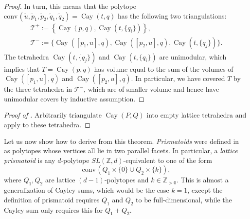 \documentclass{amsart}
\theoremstyle{plain}
\theoremstyle{definition}
\newcommand{\Z}{ \ensuremath{\mathbb{Z}}}
\newcommand{\conv}{\ensuremath{\mathrm{conv}}\hspace{1pt}}
\newcommand{\cayley}{\operatorname{Cay}}
\newcommand{\giulia}[1]{\todo[size=\tiny,color=blue!30]{#1 \\ \hfill --- G.}}
\begin{document}
\begin{proof}
In turn, this means that the polytope $\conv(\tilde u, \tilde p_1, \tilde p_2, \tilde q_1, \tilde q_2) = \cayley(t,q)$
 has the following two triangulations:
\begin{gather*}
\mathcal T^+:= \left\{ \cayley(p,q), \cayley(t, \{q_i\}) \right\},
\\
\mathcal T^-:= \{ \cayley([p_1,u],q), \cayley([p_2,u],q), \cayley(t, \{q_j\}) \}.
\end{gather*}
The tetrahedra $\cayley(t, \{q_j\})$ and $\cayley(t, \{q_i\})$ are unimodular, which implies that $T=\cayley(p,q)$ has volume equal to the sum of the volumes of $\cayley([p_1,u],q)$ and $\cayley([p_2,u],q)$. In particular, we have covered $T$ by the three tetrahedra in $\mathcal T^-$, which are of smaller volume and hence have unimodular covers by inductive assumption.
%
%
\end{proof}

\begin{proof}[Proof of ]
Arbitrarily triangulate $\cayley(P,Q)$ into empty lattice tetrahedra and apply  to these tetrahedra.
\end{proof}

Let us now show how to derive  from this theorem.
\emph{Prismatoids} were defined in~\cite{Santos-hirsch} as polytopes whose vertices all lie in two parallel facets. In particular, a \emph{lattice prismatoid} is any $d$-polytope $SL(\Z,d)$-equivalent to one of the form
\[
\conv(Q_1\times\{0\} \cup Q_2 \times \{k\}),
\]
where $Q_1,Q_2$ are lattice $(d-1)$-polytopes and $k\in \Z_{>0}$. This is almost a generalization of Cayley sums, which would be the case $k=1$, except the definition of prismatoid requires $Q_1$ and $Q_2$ to be full-dimensional, while the Cayley sum only requires this for $Q_1+Q_2$.
\end{document}

